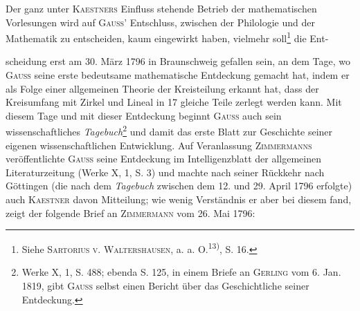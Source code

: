 Der ganz unter \textsc{Kaestners} Einfluss stehende Betrieb der mathematischen
Vorlesungen wird auf \textsc{Gauss}’ Entschluss, zwischen der Philologie und der
Mathematik zu entscheiden, kaum eingewirkt haben, vielmehr soll\footnote{Siehe \textsc{Sartorius v. Waltershausen}, a. a. O.\textsuperscript{13)}, S. 16.} die Ent-\par
{}
\clearpage{}
\noindent scheidung erst am 30. März 1796 in Braunschweig gefallen sein, an dem Tage,
wo \textsc{Gauss} seine erste bedeutsame mathematische Entdeckung gemacht hat,
indem er als Folge einer allgemeinen Theorie der Kreisteilung erkannt hat,
dass der Kreisumfang mit Zirkel und Lineal in 17 gleiche Teile zerlegt werden
kann. Mit diesem Tage und mit dieser Entdeckung beginnt \textsc{Gauss} auch sein
wissenschaftliches \textit{Tagebuch}\footnote{Werke X, 1, S. 488; ebenda S. 125, in einem Briefe an \textsc{Gerling} vom 6. Jan. 1819, gibt \textsc{Gauss} selbst einen Bericht über das Geschichtliche seiner Entdeckung.} und damit das erste Blatt zur Geschichte seiner
eigenen wissenschaftlichen Entwicklung. Auf Veranlassung \textsc{Zimmermanns} veröffentlichte
\textsc{Gauss} seine Entdeckung im Intelligenzblatt der allgemeinen Literaturzeitung
(Werke X, 1, S. 3) und machte nach seiner Rückkehr nach
Göttingen (die nach dem \textit{Tagebuch} zwischen dem 12. und 29. April 1796 erfolgte)
auch \textsc{Kaestner} davon Mitteilung; wie wenig Verständnis er aber bei
diesem fand, zeigt der folgende Brief an \textsc{Zimmermann} vom 26. Mai 1796:

